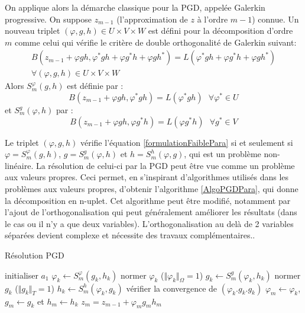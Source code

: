 \documentclass[12pt,a4paper]{report}
\begin{document}
On applique alors la démarche classique pour la PGD, appelée Galerkin progressive. On suppose $z_{m-1}$ (l'approximation de $z$ à l'ordre $m-1$) connue. Un nouveau triplet $(\varphi, g, h) \in  U \times V \times W$ est défini pour la décomposition d'ordre $m$ comme celui qui vérifie le critère de double orthogonalité de Galerkin suivant:
\begin{equation}
\label{formulationFaiblePara}
\begin{array}{c}
B(z_{m-1} + \varphi g h , \varphi^*  g h + \varphi g^* h + \varphi g h^* ) = L (\varphi^*  g h + \varphi g^* h + \varphi g h^*) 
\\
\forall (\varphi, g, h) \in  U \times V \times W
\end{array}
\end{equation}
Alors $S^{\varphi}_m (g,h)$ est définie par :
\begin{equation}
B(z_{m-1} + \varphi g h , \varphi^*  g h) = L (\varphi^* g h) ~~~
\forall \varphi^*  \in U
\end{equation}
et $S^g_m (\varphi,h)$ par :
\begin{equation}
B(z_{m-1} + \varphi g h , \varphi  g^* h) = L (\varphi g^* h) ~~~
\forall g^* \in V 
\end{equation}

Le triplet $(\varphi, g, h)$ vérifie l'équation \ref{formulationFaiblePara} si et seulement si $\varphi = S^{\varphi}_m (g,h)$, $g = S^g_m (\varphi,h)$ et $ h = S^h_m (\varphi,g)$, qui est un problème non-linéaire. La résolution de celui-ci par la PGD peut être vue comme un problème aux valeurs propres.
Ceci permet, en s'inspirant d'algorithmes utilisés dans les problèmes aux valeurs propres, d'obtenir l'algorithme \ref{AlgoPGDPara}, qui donne la décomposition en n-uplet. Cet algorithme peut être modifié, notamment par l'ajout de l'orthogonalisation qui peut généralement améliorer les résultats (dans le cas ou il n'y a que deux variables). L'orthogonalisation au delà de 2 variables séparées devient complexe et nécessite des travaux complémentaires..
\label{TrouverProblem}


\begin{algorithm}
\caption{Résolution PGD}
\begin{algorithmic}[1]
\STATE initialiser $a_1$
\STATE $\varphi_k \leftarrow S^{\varphi}_m(g_k,h_k)$
\STATE normer $\varphi_k$ ($\Vert\varphi_k\Vert_\Omega = 1$)
\STATE $g_k \leftarrow S^g_m (\varphi_k,h_k)$
\STATE normer $g_k$ ($\Vert g_k\Vert_T = 1$)
\STATE $h_k \leftarrow S^h_m (\varphi_k,g_k)$
\STATE vérifier la convergence de $(\varphi_k.g_k.g_k)$
\ENDFOR
\STATE $\varphi_m \leftarrow \varphi_k$, $g_m \leftarrow g_k$ et $h_m \leftarrow h_k$
\STATE $z_m = z_{m-1} + \varphi_m g_m h_m$
\ENDFOR
\end{algorithmic}
\label{AlgoPGDPara}
\end{algorithm}
\label{AlgoPGDPartiePara}
\end{document}
